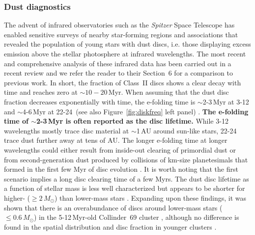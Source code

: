 \documentclass{rsos}
\begin{document}
\subsubsection{Dust diagnostics}\label{sect:dust}
The advent of infrared observatories such as the {\it Spitzer} Space Telescope has enabled sensitive surveys of nearby star-forming regions and associations that revealed the population of young stars with dust discs, i.e. those displaying excess emission above the stellar photosphere at infrared wavelengths. The most recent and comprehensive analysis of these infrared data has been carried out in a recent review \cite{2014A&A...561A..54R} and we refer the reader to their Section~6 for a comparison to previous work.
In short, the fraction of Class~II discs shows a clear decay with time and reaches zero at $\sim 10-20$\,Myr. When assuming that the dust disc fraction decreases exponentially with time, the e-folding time is $\sim$2-3\,Myr at 3-12\,\micron{} and $\sim$4-6\,Myr at 22-24\,\micron{} (see also Figure~\ref{fig:diskfreq} left panel) . {\bf The e-folding time of $\sim$2-3\,Myr is often reported as the disc lifetime.}
While 3-12\,\micron{} wavelengths mostly trace disc material at $\sim$1\,AU around sun-like stars, 22-24\,\micron{} trace dust further away at tens of AU.
 The longer e-folding time at longer wavelengths could either result from inside-out clearing of primordial dust or from second-generation dust produced by collisions of km-size planetesimals that formed in the first few Myr of disc evolution 
 \cite{2008ApJ...672..558C}. It is worth noting that the first scenario implies a  long disc clearing time of a few Myrs. The dust disc lifetime as a function of stellar mass is less well characterized but appears to be shorter for higher- ($\ge 2\,M_\odot$) than lower-mass stars \cite{2006ApJ...651L..49C,2015A&A...576A..52R}. Expanding upon these findings, it was shown that there is an overabundance of discs around lower-mass stars ($\le 0.6\,M_\odot$) in the 5-12\,Myr-old Collinder~69 cluster \cite{2012A&A...547A..80B}, although no difference is found in the spatial distribution and disc fraction in younger clusters \cite{2011MNRAS.416..439E,2013MNRAS.428.3327K}.
\end{document}
